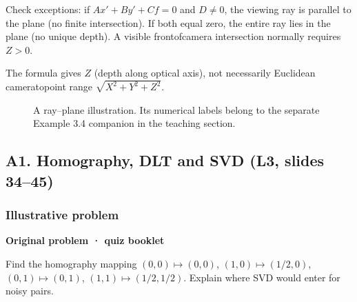 \documentclass[letterpaper,11pt,english,openany,oneside]{jupyterBook}
\begin{document}
\sphinxAtStartPar
Check exceptions: if {\color{QuizMathBlue} \(Ax'+By'+Cf=0\)} and {\color{QuizMathBlue} \(D\ne0\)}, the viewing ray is parallel to the plane (no finite intersection). If both equal zero, the entire ray lies in the plane (no unique depth). A visible front\sphinxhyphen{}of\sphinxhyphen{}camera intersection normally requires {\color{QuizMathBlue} \(Z>0\)}.

\par

\sphinxAtStartPar
{} The formula gives \(Z\) (depth along optical axis), not necessarily Euclidean camera\sphinxhyphen{}to\sphinxhyphen{}point range \(\sqrt{X^2+Y^2+Z^2}\).

\begin{figure}[H]
\centering
\capstart

\noindent{}
\caption{A ray–plane illustration. Its numerical labels belong to the separate Example 3.4 companion in the teaching section.}\label{\detokenize{lectures/lecture03/quiz-workbook:id11}}\end{figure}


\subsection{A1. Homography, DLT and SVD (L3, slides 34–45)}
\label{\detokenize{lectures/lecture03/quiz-workbook:a1-homography-dlt-and-svd-l3-slides-3445}}\label{\detokenize{lectures/lecture03/quiz-workbook:quiz-source-a1}}
\sphinxAtStartPar
{}


\subsubsection{Illustrative problem}
\label{\detokenize{lectures/lecture03/quiz-workbook:illustrative-problem}}\label{\detokenize{lectures/lecture03/quiz-workbook:quiz-a1-q1}}
\par\medskip\textbf{Original problem · quiz booklet}\par\smallskip

\sphinxAtStartPar
Find the homography mapping \((0,0)\mapsto(0,0)\), \((1,0)\mapsto(1/2,0)\), \((0,1)\mapsto(0,1)\), \((1,1)\mapsto(1/2,1/2)\). Explain where SVD would enter for noisy pairs.

\par\medskip
\end{document}
